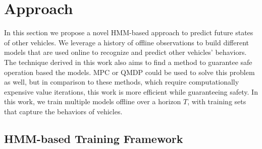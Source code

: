 \documentclass[letterpaper, 10 pt, conference]{ieeeconf}  %
\newcommand\NB[1]{$\spadesuit$\footnote{NB: #1}}
\begin{document}
\section{Approach} \label{sec:approach}

In this section we propose a novel HMM-based approach to predict future states of other vehicles. We leverage a history of offline observations to build different models that are used online to recognize and predict other vehicles' behaviors. The technique derived in this work also aims to find a method to guarantee safe operation based the models. %
MPC\cite{mpc} or QMDP\cite{qmdp} could be used to solve this problem as well, but in comparison to these methods, which require computationally expensive value iterations, this work is more efficient while guaranteeing safety. In this work, we train multiple models offline over a horizon $T$, with training sets that capture the behaviors of vehicles.


\subsection{HMM-based Training Framework} \label{sec:fmwk}
\end{document}
